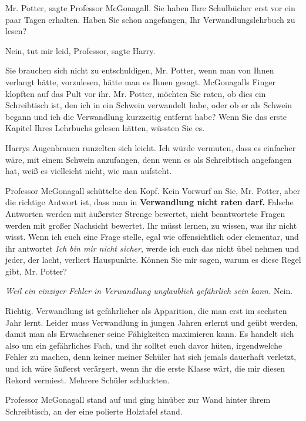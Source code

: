 \glqq Mr. Potter\grqq{}, sagte Professor McGonagall. \glqq Sie haben Ihre
Schulbücher erst vor ein paar Tagen erhalten. Haben Sie schon angefangen, Ihr
Verwandlungslehrbuch zu lesen?\grqq{}

\glqq Nein, tut mir leid, Professor\grqq{}, sagte Harry.

\glqq Sie brauchen sich nicht zu entschuldigen, Mr. Potter, wenn man von Ihnen
verlangt hätte, vorzulesen, hätte man es Ihnen gesagt.\grqq{} McGonagalls Finger
klopften auf das Pult vor ihr. \glqq Mr. Potter, möchten Sie raten, ob dies ein
Schreibtisch ist, den ich in ein Schwein verwandelt habe, oder ob er als Schwein
begann und ich die Verwandlung kurzzeitig entfernt habe? Wenn Sie das erste
Kapitel Ihres Lehrbuchs gelesen hätten, wüssten Sie es.\grqq{}

Harrys Augenbrauen runzelten sich leicht. \glqq Ich würde vermuten, dass es
einfacher wäre, mit einem Schwein anzufangen, denn wenn es als Schreibtisch
angefangen hat, weiß es vielleicht nicht, wie man aufsteht.\grqq{}

Professor McGonagall schüttelte den Kopf. \glqq Kein Vorwurf an Sie, Mr. Potter,
aber die richtige Antwort ist, dass man in \textbf{Verwandlung nicht raten
darf.} Falsche Antworten werden mit äußerster Strenge bewertet, nicht
beantwortete Fragen werden mit großer Nachsicht bewertet. Ihr müsst lernen, zu
wissen, was ihr nicht wisst. Wenn ich euch eine Frage stelle, egal wie
offensichtlich oder elementar, und ihr antwortet \emph{\glqq Ich bin mir nicht
sicher\grqq{}}, werde ich euch das nicht übel nehmen und jeder, der lacht,
verliert Hauspunkte. Können Sie mir sagen, warum es diese Regel gibt, Mr.
Potter?\grqq{}

\emph{Weil ein einziger Fehler in Verwandlung unglaublich gefährlich sein kann.}
\glqq Nein.\grqq{}

\glqq Richtig. Verwandlung ist gefährlicher als Apparition, die man erst im
sechsten Jahr lernt. Leider muss Verwandlung in jungen Jahren erlernt und geübt
werden, damit man als Erwachsener seine Fähigkeiten maximieren kann. Es handelt
sich also um ein gefährliches Fach, und ihr solltet euch davor hüten,
irgendwelche Fehler zu machen, denn keiner meiner Schüler hat sich jemals
dauerhaft verletzt, und ich wäre äußerst verärgert, wenn ihr die erste Klasse
wärt, die mir diesen Rekord vermiest.\grqq{} Mehrere Schüler schluckten.

Professor McGonagall stand auf und ging hinüber zur Wand hinter ihrem
Schreibtisch, an der eine polierte Holztafel stand.

